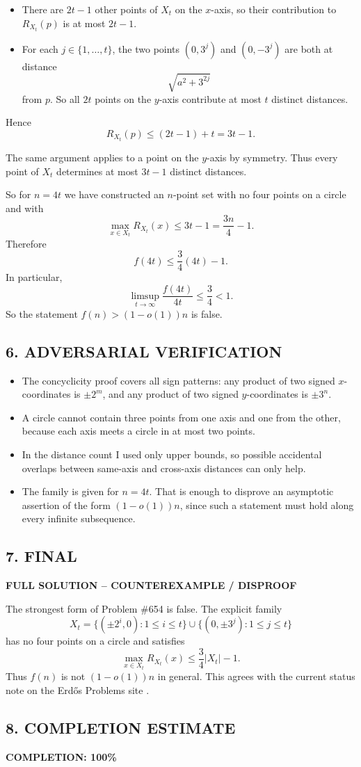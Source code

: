 \begin{itemize}
\item There are $2t-1$ other points of $X_t$ on the $x$-axis, so their contribution to $R_{X_t}(p)$ is at most $2t-1$.
\item For each $j\in\{1,\dots,t\}$, the two points $(0,3^j)$ and $(0,-3^j)$ are both at distance
\[
\sqrt{a^2+3^{2j}}
\]
from $p$.  So all $2t$ points on the $y$-axis contribute at most $t$ distinct distances.
\end{itemize}
Hence
\[
R_{X_t}(p)\le (2t-1)+t=3t-1.
\]

The same argument applies to a point on the $y$-axis by symmetry.  Thus every point of $X_t$ determines at most $3t-1$ distinct distances.

So for $n=4t$ we have constructed an $n$-point set with no four points on a circle and with
\[
\max_{x\in X_t}R_{X_t}(x)\le 3t-1=\frac{3n}{4}-1.
\]
Therefore
\[
f(4t)\le \frac{3}{4}(4t)-1.
\]
In particular,
\[
\limsup_{t\to\infty}\frac{f(4t)}{4t}\le \frac{3}{4}<1.
\]
So the statement $f(n)>(1-o(1))n$ is false.

\subsection*{6. ADVERSARIAL VERIFICATION}

\begin{itemize}
\item The concyclicity proof covers all sign patterns: any product of two signed $x$-coordinates is $\pm 2^m$, and any product of two signed $y$-coordinates is $\pm 3^n$.
\item A circle cannot contain three points from one axis and one from the other, because each axis meets a circle in at most two points.
\item In the distance count I used only upper bounds, so possible accidental overlaps between same-axis and cross-axis distances can only help.
\item The family is given for $n=4t$.  That is enough to disprove an asymptotic assertion of the form $(1-o(1))n$, since such a statement must hold along every infinite subsequence.
\end{itemize}

\subsection*{7. FINAL}

\textbf{FULL SOLUTION -- COUNTEREXAMPLE / DISPROOF}

The strongest form of Problem \#654 is false.  The explicit family
\[
X_t=\{(\pm 2^i,0):1\le i\le t\}\cup\{(0,\pm 3^j):1\le j\le t\}
\]
has no four points on a circle and satisfies
\[
\max_{x\in X_t}R_{X_t}(x)\le \frac{3}{4}|X_t|-1.
\]
Thus $f(n)$ is not $(1-o(1))n$ in general.  This agrees with the current status note on the Erd\H{o}s Problems site \cite{EP654}.

\subsection*{8. COMPLETION ESTIMATE}

\textbf{COMPLETION: 100\%}
